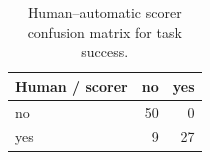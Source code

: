 \begin{table}[t]
\centering
\small
\begin{tabular}{lrr}
\toprule
Human / scorer & no & yes \\
\midrule
no & 50 & 0 \\
yes & 9 & 27 \\
\bottomrule
\end{tabular}
\caption{Human--automatic scorer confusion matrix for task success.}
\end{table}
